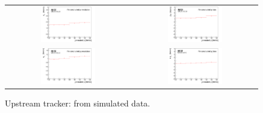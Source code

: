 \begin{figure}
  \begin{center}
    \begin{tabular}{cc}
      \includegraphics[width=0.45\textwidth]{downstream_p_resolution_p_logo.png} &	
      \includegraphics[width=0.45\textwidth]{downstream_p_bias_p_logo.png} \\
      \includegraphics[width=0.45\textwidth]{downstream_pt_resolution_p_logo.png} &
      \includegraphics[width=0.45\textwidth]{downstream_pt_bias_p_logo.png}
    \end{tabular}
  \end{center}
  \caption{
    Upstream tracker: from simulated data.
  }
  \label{trackers:performance:resolutions:down}
\end{figure}

